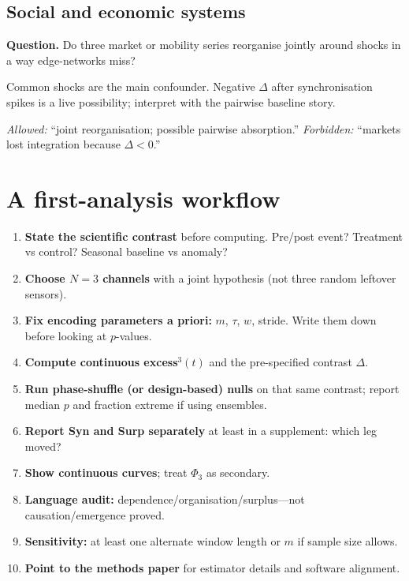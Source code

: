 \documentclass[11pt,a4paper]{article}
\begin{document}
\subsection{Social and economic systems}

\begin{fieldbox}
\textbf{Question.} Do three market or mobility series reorganise jointly
around shocks in a way edge-networks miss?
\end{fieldbox}
Common shocks are the main confounder. Negative $\Delta$ after
synchronisation spikes is a live possibility; interpret with the pairwise
baseline story.
\par\noindent\textit{Allowed:} ``joint reorganisation; possible pairwise absorption.''
\textit{Forbidden:} ``markets lost integration because $\Delta<0$.''

\section{A first-analysis workflow}
\label{sec:workflow}

\begin{enumerate}[leftmargin=*,itemsep=4pt]
  \item \textbf{State the scientific contrast} before computing.
  Pre/post event? Treatment vs control? Seasonal baseline vs anomaly?

  \item \textbf{Choose $N=3$ channels} with a joint hypothesis (not three
  random leftover sensors).

  \item \textbf{Fix encoding parameters a priori:} $m$, $\tau$, $w$,
  stride. Write them down before looking at $p$-values.

  \item \textbf{Compute continuous excess$^3(t)$} and the pre-specified
  contrast $\Delta$.

  \item \textbf{Run phase-shuffle (or design-based) nulls} on that same
  contrast; report median $p$ and fraction extreme if using ensembles.

  \item \textbf{Report Syn and Surp separately} at least in a supplement:
  which leg moved?

  \item \textbf{Show continuous curves}; treat $\Phi_3$ as secondary.

  \item \textbf{Language audit:} dependence/organisation/surplus---not
  causation/emergence proved.

  \item \textbf{Sensitivity:} at least one alternate window length or $m$
  if sample size allows.

  \item \textbf{Point to the methods paper} for estimator details and
  software alignment.
\end{enumerate}
\end{document}
